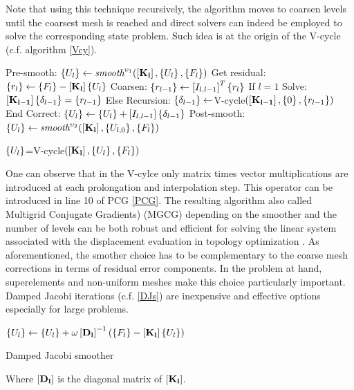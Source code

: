 Note that using this technique recursively, the algorithm moves to coarsen levels until the coarsest mesh is reached and direct solvers can indeed be employed to solve the corresponding state problem. Such idea is at the origin of the V-cycle (c.f. algorithm \ref{Vcy}).
  \begin{algorithm}
 Pre-smooth: $\left\lbrace{U_{l}}\right \rbrace\gets\textit{smooth}^{\upsilon_1}(\left[{\mathbf{K_{l}}}\right],\left\lbrace{U_{l}}\right \rbrace,\left\lbrace{F_{l}}\right \rbrace)$\;
 Get residual: $\left\lbrace{r_{l}}\right \rbrace\gets\left\lbrace{F_{l}}\right \rbrace-\left[{\mathbf{K_{l}}}\right]\left\lbrace{U_{l}}\right \rbrace$\;
 Coarsen: $\left\lbrace{r_{l-1}}\right \rbrace\gets\left[{I_{l,l-1}}\right]^T\left\lbrace{r_{l}}\right \rbrace$\;
If $l=1$\;
 Solve: $\left[{\mathbf{K_{l-1}}}\right]\left\lbrace{\delta_{l-1}}\right \rbrace=\left\lbrace{r_{l-1}}\right \rbrace$\;
 Else \;
 Recursion: $\left\lbrace{\delta_{l-1}}\right \rbrace\gets$V-cycle$(\left[{\mathbf{K_{l-1}}}\right],\left\lbrace{0}\right \rbrace,\left\lbrace{r_{l-1}}\right \rbrace)$\;
End \;
 Correct: $\left\lbrace{U_{l}}\right \rbrace\gets\left\lbrace{U_{l}}\right \rbrace+\left[{I_{l,l-1}}\right]\left\lbrace{\delta_{l-1}}\right \rbrace$\;
 Post-smooth: $\left\lbrace{U_{l}}\right \rbrace\gets\textit{smooth}^{\upsilon_2}(\left[{\mathbf{K_{l}}}\right],\left\lbrace{U_{l,0}}\right \rbrace,\left\lbrace{F_{l}}\right \rbrace)$\;
   \caption{$\left\lbrace{U_{l}}\right \rbrace$=V-cycle$(\left[{\mathbf{K_{l}}}\right],\left\lbrace{U_{l}}\right \rbrace,\left\lbrace{F_{l}}\right \rbrace)$ \label{Vcy}}
  \end{algorithm}
  One can observe that in the V-cylce only matrix times vector multiplications are introduced at each prolongation and interpolation step. This operator can be introduced in line 10 of PCG \ref{PCG}. The resulting algorithm also called Multigrid Conjugate Gradients) (MGCG) \cite{tatebe1994efficient,ashby1996parallel} depending on the smoother and the number of levels can be both robust and efficient for solving the linear system associated with the displacement evaluation in topology optimization \cite{amir2014multigrid,aage2017giga}. As aforementioned, the smother choice has to be complementary to the coarse mesh corrections in terms of residual error components. In the problem at hand, superelements and non-uniform meshes make this choice particularly important. Damped Jacobi iterations (c.f. \ref{DJs}) are inexpensive and effective options especially for large problems.
  \begin{algorithm}
 $\left\lbrace{U_{l}}\right \rbrace\gets\left\lbrace{U_{l}}\right \rbrace+\omega\left[{\mathbf{D_{l}}}\right]^{-1}\left(\left\lbrace{F_{l}}\right \rbrace-\left[{\mathbf{K_{l}}}\right]\left\lbrace{U_{l}}\right \rbrace\right)$\;
 \caption{Damped Jacobi smoother \label{DJs}}
  \end{algorithm}
  \clearpage
  Where $\left[{\mathbf{D_{l}}}\right]$ is the diagonal matrix of $\left[{\mathbf{K_{l}}}\right]$. 
